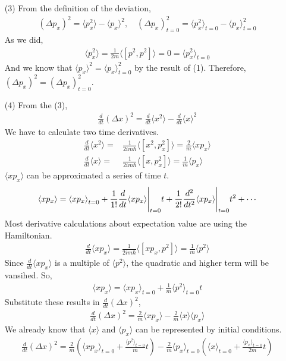 \documentclass[aps,floatfix,nofootinbib,superscriptaddress,fleqn]{revtex4}
\begin{document}
\begin{itemize}
  \item[(3)]From the definition of the deviation,
   \begin{align}
    {(\Delta p_x)}^2 = \langle p_x^2\rangle - \langle p_x\rangle^2, \quad {(\Delta p_x)}^2_{t=0} = \langle p_x^2\rangle_{t=0} - \langle p_x\rangle^2_{t=0}
   \end{align}
  As we did, 
    \begin{align}
      \langle p_x^2\rangle = \frac{1}{2m}\langle \left[p^2,p^2\right] \rangle = 0 = \langle p_x^2\rangle_{t=0}
    \end{align}
  And we know that $\langle p_x\rangle^2 = \langle p_x\rangle^2_{t=0}$ by the result of (1).
  Therefore, ${(\Delta p_x)}^2  = {(\Delta p_x)}^2_{t=0}$.

  \item[(4)] From the (3),
    \begin{align}
      \frac{d}{dt}{(\Delta x)}^2 = \frac{d}{dt}\langle x^2\rangle - \frac{d}{dt}\langle x\rangle^2
    \end{align}
  We have to calculate two time derivatives.
    \begin{align}
      \frac{d}{dt}\langle x^2\rangle=&\frac{1}{2im\hbar}\langle\left[x^2,p^2_x\right]\rangle=\frac{2}{m}\langle xp_x \rangle \\
      \frac{d}{dt}\langle x\rangle=&\frac{1}{2im\hbar}\langle\left[x,p^2_x\right]\rangle=\frac{1}{m}\langle p_x\rangle
    \end{align}
  $\langle xp_x \rangle$ can be approximated a series of time $t$.
    \begin{align}
      \langle xp_x \rangle = {\langle xp_x \rangle}_{t=0} + \frac{1}{1!}\frac{d}{dt}\langle xp_x \rangle \Bigg{|}_{t=0}t 
      + \frac{1}{2!}\frac{d^2}{dt^2}\langle xp_x \rangle \Bigg{|}_{t=0}t^2+\cdots
    \end{align}
  Most derivative calculations about expectation value are using the Hamiltonian.
    \begin{align}
      \frac{d}{dt}\langle xp_x \rangle = \frac{1}{2im\hbar}\langle \left[ xp_x,p^2 \right] \rangle= \frac{1}{m}\langle p^2 \rangle
    \end{align} 
  Since $\frac{d}{dt}\langle xp_x \rangle$ is a multiple of $\langle p^2 \rangle$, the quadratic and higher term will be vansihed. So,
    \begin{align}
      \langle xp_x \rangle=\langle xp_x \rangle_{t=0}+\frac{1}{m}\langle p^2 \rangle_{t=0}t
    \end{align}
  Substitute these results in $\frac{d}{dt}{(\Delta x)}^2$,
    \begin{align}
      \frac{d}{dt}{(\Delta x)}^2=\frac{2}{m}\langle xp_x \rangle- \frac{2}{m}\langle x\rangle\langle p_x\rangle
    \end{align}
  We already know that $\langle x \rangle$ and $\langle p_x \rangle$ can be represented by initial conditions.
   \begin{align}
    \frac{d}{dt}{(\Delta x)}^2 = \frac{2}{m}\left(\langle xp_x \rangle_{t=0}+\frac{\langle p^2 \rangle_{t=0}}{m}t\right) 
    -\frac{2}{m}\langle p_x\rangle_{t=0}\left(\langle x\rangle_{t=0}+\frac{\langle p_x \rangle_{t=0}}{2m}t\right)
   \end{align}
\end{itemize}
\end{document}
